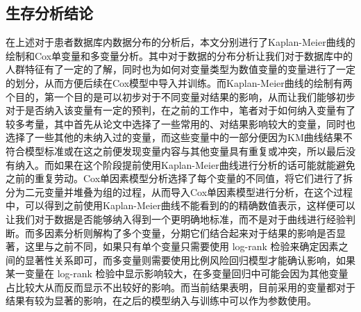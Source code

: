 \subsection{生存分析结论}

在上述对于患者数据库内数据分布的分析后，本文分别进行了Kaplan-Meier曲线的绘制和Cox单变量和多变量分析。其中对于数据的分布分析让我们对于数据库中的人群特征有了一定的了解，同时也为如何对变量类型为数值变量的变量进行了一定的划分，从而方便后续在Cox模型中导入并训练。而Kaplan-Meier曲线的绘制有两个目的，第一个目的是可以初步对于不同变量对结果的影响，从而让我们能够初步对于是否纳入该变量有一定的预判，在之前的工作中，笔者对于如何纳入变量有了较多考量，其中首先从论文中选择了一些常用的、对结果影响较大的变量，同时也选择了一些其他的未纳入过的变量，而这些变量中的一部分便因为KM曲线结果不符合模型标准或在这之前便发现变量内容与其他变量具有重复或冲突，所以最后没有纳入。而如果在这个阶段提前使用Kaplan-Meier曲线进行分析的话可能就能避免之前的重复劳动。Cox单因素模型分析选择了每个变量的不同值，将它们进行了拆分为二元变量并堆叠为组的过程，从而导入Cox单因素模型进行分析，在这个过程中，可以得到之前使用Kaplan-Meier曲线不能看到的的精确数值表示，这样便可以让我们对于数据是否能够纳入得到一个更明确地标准，而不是对于曲线进行经验判断。而多因素分析则解构了多个变量，分期它们结合起来对于结果的影响是否显著，这里与之前不同，如果只有单个变量只需要使用 log-rank 检验来确定因素之间的显著性关系即可，而多变量则需要使用比例风险回归模型才能确认影响，如果某一变量在 log-rank 检验中显示影响较大，在多变量回归中可能会因为其他变量占比较大从而反而显示不出较好的影响。而当前结果表明，目前采用的变量都对于结果有较为显著的影响，在之后的模型纳入与训练中可以作为参数使用。
